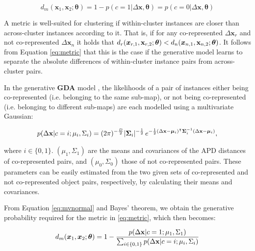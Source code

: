 \begin{equation}
\label{eq:metric}
d_m(\boldsymbol x_1, \boldsymbol x_2; \boldsymbol{\theta}) = 1 - p(c=1|\Delta \boldsymbol x, \boldsymbol{\theta}) = p(c=0|\Delta \boldsymbol x, \boldsymbol{\theta})
\end{equation}

A metric is well-suited for clustering if within-cluster instances are closer than across-cluster instances according to it. That is, if for any co-represented $\Delta \boldsymbol x_r$ and not co-represented $\Delta \boldsymbol x_n $ it holds that $ d_r(\boldsymbol x_{r,1}, \textbf x_{r,2}; \boldsymbol{\theta}) < d_n(\boldsymbol x_{n,1}, \textbf x_{n,2}; \boldsymbol{\theta}) $. It follows from Equation \ref{eq:metric} that this is the case if the generative model learns to separate the absolute differences of within-cluster instance pairs from across-cluster pairs.

In the generative \textbf{GDA} model \citep{bensmail1996regularized}, the likelihoods of a pair of instances either being co-represented (i.e. belonging to the same sub-map), or not being co-represented (i.e. belonging to different sub-maps) are each modelled using a multivariate Gaussian: 

\begin{equation}
\label{eq:mvnormal}
p( \Delta \textbf x | c=i; \mu_i, \Sigma_i) = (2\pi)^{-\frac{D}{2}}|\boldsymbol\Sigma_i|^{-\frac{1}{2}}\, e^{ -\frac{1}{2}(\Delta \mathbf{x}-\boldsymbol\mu_i)^\intercal\boldsymbol\Sigma_i^{-1}(\Delta \mathbf{x}-\boldsymbol\mu_i) },
\end{equation}

where $i \in \{0,1\}$. $(\mu_1, \Sigma_1)$ are the means and covariances of the APD distances of co-represented pairs, and $(\mu_0, \Sigma_0)$ those of not co-represented pairs. These parameters can be easily estimated from the two given sets of co-represented and not co-represented object pairs, respectively, by calculating their means and covariances. 

From Equation \ref{eq:mvnormal} and Bayes' theorem, we obtain the generative probability required for the metric in \ref{eq:metric}, which then becomes:

\begin{equation}
\label{eq:adsgda}
d_m(\boldsymbol x_1, \boldsymbol x_2; \boldsymbol{\theta}) = 1 - \frac{p( \Delta \textbf x | c=1; \mu_1, \Sigma_1)}{\sum_{i \in \{0,1\}} {p( \Delta \textbf x | c=i; \mu_i, \Sigma_i)}}
\end{equation}

